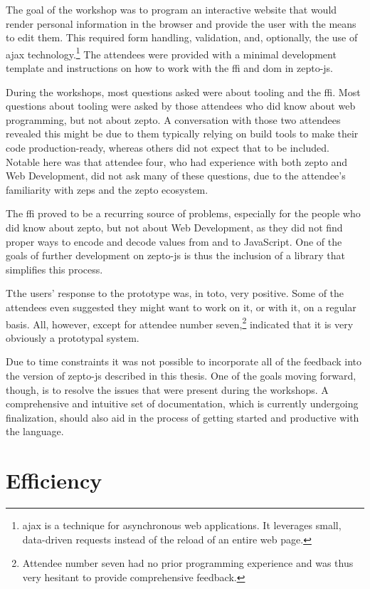 \documentclass[oneside,11pt,xetex]{scrbook}
\begin{document}
The goal of the workshop was to program an interactive website that would
render personal information in the browser and provide the user with the means
to edit them. This required form handling, validation, and, optionally, the
use of \gls{ajax} technology.\footnote{\gls{ajax} is a technique for asynchronous
web applications. It leverages small, data-driven requests instead of the reload
of an entire web page.} The attendees were provided with a minimal development
template and instructions on how to work with the \gls{ffi} and \gls{dom} in zepto-js.

During the workshops, most questions asked were about tooling and the \gls{ffi}.
Most questions about tooling were asked by those attendees who did know about
web programming, but not about zepto. A conversation with those two attendees
revealed this might be due to them typically relying on build tools to make
their code production-ready, whereas others did not expect that to be included.
Notable here was that attendee four, who had experience with both zepto and Web
Development, did not ask many of these questions, due to the attendee's familiarity
with \gls{zeps} and the zepto ecosystem.

The \gls{ffi} proved to be a recurring source of problems, especially for the
people who did know about zepto, but not about Web Development, as they did not
find proper ways to encode and decode values from and to JavaScript. One of the
goals of further development on zepto-js is thus the inclusion of a library that
simplifies this process.

Tthe users' response to the prototype was, in toto, very positive. Some
of the attendees even suggested they might want to work on it, or with it, on
a regular basis. All, however, except for attendee number seven,\footnote{Attendee
number seven had no prior programming experience and was thus very hesitant to
provide comprehensive feedback.} indicated that it is very obviously a prototypal
system.

Due to time constraints it was not possible to incorporate all of the feedback into
the version of zepto-js described in this thesis. One of the goals moving forward, though,
is to resolve the issues that were present during the workshops. A comprehensive
and intuitive set of documentation, which is currently undergoing finalization, should
also aid in the process of getting started and productive with the language.

\section{Efficiency}
\end{document}
